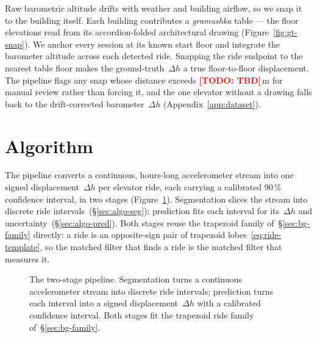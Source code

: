 \documentclass[manuscript,review,screen]{acmart}
\newcommand{\todo}[1]{\textcolor{red}{\textbf{[TODO: #1]}}}
\begin{document}
Raw barometric altitude drifts with weather and building airflow, so
we snap it to the building itself.  Each building contributes a
\emph{gramushka} table --- the floor elevations read from its
accordion-folded architectural drawing (Figure~\ref{fig:gt-snap}).
We anchor every session at its known start floor and integrate the
barometer altitude across each detected ride.  Snapping the ride
endpoint to the nearest table floor makes the ground-truth~$\Delta h$
a true floor-to-floor displacement.  The pipeline flags any snap
whose distance exceeds \todo{TBD}\,m for manual review rather than
forcing it, and the one elevator without a drawing falls back to the
drift-corrected barometer~$\Delta h$ (Appendix~\ref{app:dataset}).

\section{Algorithm}
\label{sec:algorithm}

The pipeline converts a continuous, hours-long accelerometer stream
into one signed displacement~$\Delta h$ per elevator ride, each
carrying a calibrated $90\,\%$ confidence interval, in two stages
(Figure~\ref{fig:pipeline}).  Segmentation slices the stream into
discrete ride intervals~(\S\ref{sec:algo-seg}); prediction fits each
interval for its~$\Delta h$ and uncertainty~(\S\ref{sec:algo-pred}).
Both stages reuse the trapezoid family of~\S\ref{sec:bg-family}
directly: a ride is an opposite-sign pair of trapezoid
lobes~\eqref{eq:ride-template}, so the matched filter that finds a
ride is the matched filter that measures it.

\begin{figure}[H]
\centering
{}
\caption{The two-stage pipeline.  Segmentation turns a continuous
  accelerometer stream into discrete ride intervals; prediction turns
  each interval into a signed displacement~$\Delta h$ with a
  calibrated confidence interval.  Both stages fit the trapezoid ride
  family of~\S\ref{sec:bg-family}.}
\label{fig:pipeline}
\end{figure}
\end{document}

